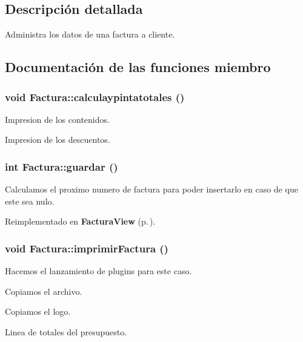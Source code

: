 \subsection{Descripci\'{o}n detallada}
Administra los datos de una factura a cliente. 



\subsection{Documentaci\'{o}n de las funciones miembro}
\subsubsection{\setlength{\rightskip}{0pt plus 5cm}void Factura::calculaypintatotales ()\hspace{0.3cm}{\tt  [virtual]}}\label{classFactura_a4}


Impresion de los contenidos.

Impresion de los descuentos. 
\subsubsection{\setlength{\rightskip}{0pt plus 5cm}int Factura::guardar ()\hspace{0.3cm}{\tt  [virtual]}}\label{classFactura_a14}


Calculamos el proximo numero de factura para poder insertarlo en caso de que este sea nulo. 

Reimplementado en {\bf Factura\-View} {\rm (p.\,\pageref{classFacturaView_a3})}.
\subsubsection{\setlength{\rightskip}{0pt plus 5cm}void Factura::imprimir\-Factura ()\hspace{0.3cm}{\tt  [virtual]}}\label{classFactura_a19}


Hacemos el lanzamiento de plugins para este caso.

Copiamos el archivo.

Copiamos el logo.

Linea de totales del presupuesto.

